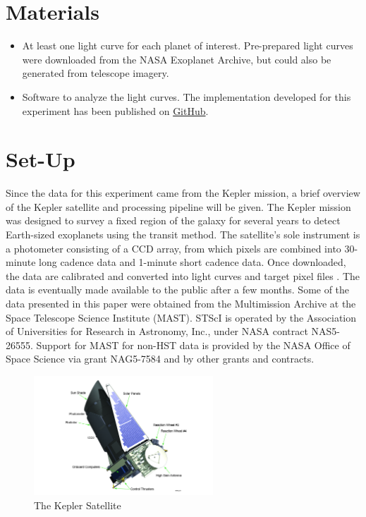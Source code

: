 \section{Materials}

\begin{itemize}
    \item At least one light curve for each planet of interest. Pre-prepared light curves were downloaded from the NASA Exoplanet Archive, but could
        also be generated from telescope imagery. \autocite{exoplanetArchive}
    \item Software to analyze the light curves. The implementation developed for this experiment has been published on \href{https://github.com/roguePanda/exoplanet-project}{GitHub}.
\end{itemize}

\section{Set-Up}

Since the data for this experiment came from the Kepler mission, a brief overview of the Kepler satellite and processing pipeline will be given.
The Kepler mission was designed to survey a fixed region of the galaxy for several years to detect Earth-sized exoplanets using the transit method. \autocite{keplerManual}
The satellite's sole instrument is a photometer consisting of a CCD array, from which pixels are combined into 30-minute long cadence data and
1-minute short cadence data. \autocite{keplerManual} Once downloaded, the data are calibrated and converted into light curves and target pixel files \autocite{keplerManual}.
The data is eventually made available to the public after a few months. Some of the data presented in this paper were obtained from the Multimission
Archive at the Space Telescope Science Institute (MAST). STScI is operated by the Association of Universities for Research in Astronomy, Inc., under NASA contract NAS5-26555.
Support for MAST for non-HST data is provided by the NASA Office of Space Science via grant NAG5-7584 and by other grants and contracts.

\begin{figure}[H]
    \centering
    \includegraphics[width=0.6\textwidth]{images/750603main_Ball_Kepler_A8468_275_lg}
    \caption{The Kepler Satellite \autocite{keplerReactionWheelUpdate}}
\end{figure}

